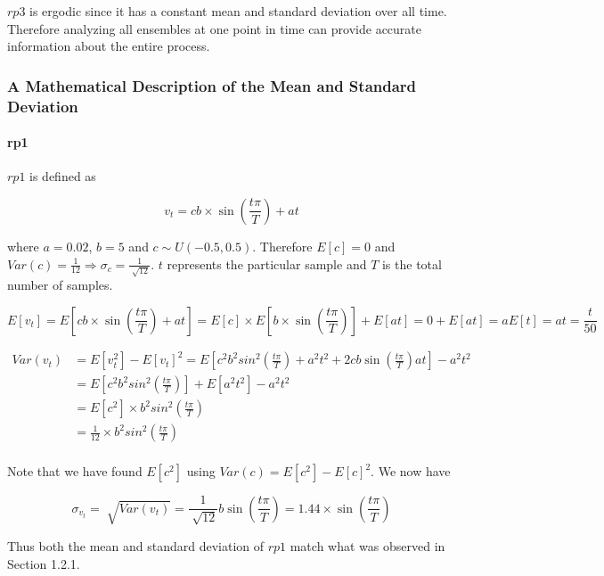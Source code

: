 \documentclass{article}
\begin{document}
$rp3$ is ergodic since it has a constant mean and standard deviation over all time. Therefore analyzing all ensembles at one point in time can provide accurate information about the entire process.

\pagebreak

\subsubsection{A Mathematical Description of the Mean and Standard Deviation}

\paragraph{rp1}

$rp1$ is defined as

\begin{equation}
v_t=cb \times \sin(\frac{t\pi}{T})+at
\end{equation}

where $a=0.02$, $b=5$ and $c\sim U(-0.5,0.5)$. Therefore $E[c]=0$ and $Var(c)=\frac{1}{12} \Rightarrow \sigma_c=\frac{1}{\sqrt[]{12}}$. $t$ represents the particular sample and $T$ is the total number of samples.

\begin{equation}
E[v_t]=E[cb \times \sin(\frac{t\pi}{T})+at]=E[c] \times E[b \times \sin(\frac{t\pi}{T})]+E[at]=0+E[at]=aE[t]=at=\frac{t}{50}
\end{equation}

\begin{align} %
Var(v_t) &= E[v_t^2]-E[v_t]^2 = E[c^2b^2sin^2(\frac{t\pi}{T})+a^2t^2+2cb\sin(\frac{t\pi}{T})at]-a^2t^2 \\
&= E[c^2b^2sin^2(\frac{t\pi}{T})]+E[a^2t^2]-a^2t^2 \\
&= E[c^2] \times b^2sin^2(\frac{t\pi}{T}) \\
&= \frac{1}{12} \times b^2sin^2(\frac{t\pi}{T}) \\
\end{align}

Note that we have found $E[c^2]$ using $Var(c)=E[c^2]-E[c]^2$. We now have

\begin{equation}
\sigma_{v_t}=\sqrt[]{Var(v_t)}=\frac{1}{\sqrt[]{12}}b\sin(\frac{t\pi}{T})=1.44 \times \sin(\frac{t\pi}{T})
\end{equation}

Thus both the mean and standard deviation of $rp1$ match what was observed in Section 1.2.1.
\end{document}
